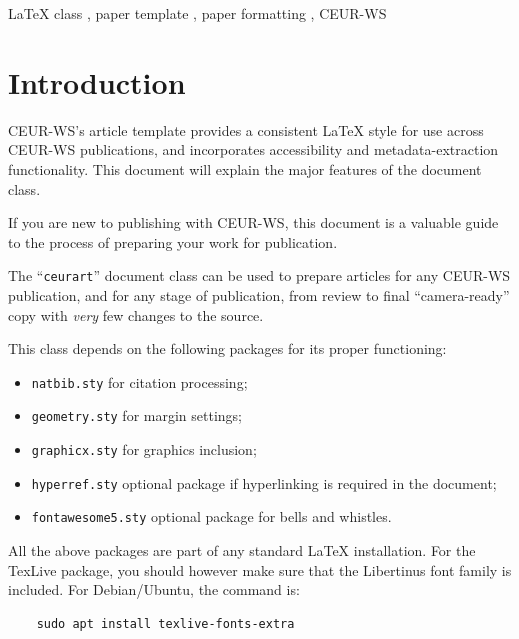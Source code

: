 \documentclass[
]{ceurart}
\begin{document}
\begin{keywords}
  LaTeX class \sep
  paper template \sep
  paper formatting \sep
  CEUR-WS
\end{keywords}

\maketitle

\section{Introduction}

CEUR-WS's article template provides a consistent \LaTeX{} style for
use across CEUR-WS publications, and incorporates accessibility and
metadata-extraction functionality. This document will explain the
major features of the document class.

If you are new to publishing with CEUR-WS, this document is a valuable
guide to the process of preparing your work for publication.

The ``\verb|ceurart|'' document class can be used to prepare articles
for any CEUR-WS publication, and for any stage of publication, from
review to final ``camera-ready'' copy with {\itshape very} few changes
to the source.

This class depends on the following packages
for its proper functioning:

\begin{itemize}
\item \verb|natbib.sty| for citation processing;
\item \verb|geometry.sty| for margin settings;
\item \verb|graphicx.sty| for graphics inclusion;
\item \verb|hyperref.sty| optional package if hyperlinking is required in
  the document;
\item \verb|fontawesome5.sty| optional package for bells and whistles.
\end{itemize}

All the above packages are part of any
standard \LaTeX{} installation.
For the TexLive package, you should however make sure that the
Libertinus font family is included. For Debian/Ubuntu, the command is:
\begin{verbatim}
    sudo apt install texlive-fonts-extra
\end{verbatim}
\end{document}
